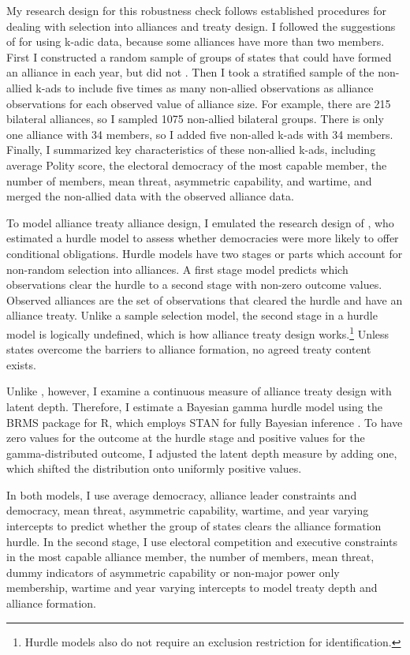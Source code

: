 \documentclass[12pt]{article}
\begin{document}
My research design for this robustness check follows established procedures for dealing with selection into alliances and treaty design. 
I followed the suggestions of \citet{Poast2010} for using k-adic data, because some alliances have more than two members. 
First I constructed a random sample of groups of states that could have formed an alliance in each year, but did not \citep{FordhamPoast2014}.
Then I took a stratified sample of the non-allied k-ads to include five times as many non-allied observations as alliance observations for each observed value of alliance size. 
For example, there are 215 bilateral alliances, so I sampled 1075 non-allied bilateral groups. 
There is only one alliance with 34 members, so I added five non-alled k-ads with 34 members. 
Finally, I summarized key characteristics of these non-allied k-ads, including average Polity score, the electoral democracy of the most capable member, the number of members, mean threat, asymmetric capability, and wartime, and merged the non-allied data with the observed alliance data. 


To model alliance treaty alliance design, I emulated the research design of \citet{Chibaetal2015}, who estimated a hurdle model to assess whether democracies were more likely to offer conditional obligations.
Hurdle models have two stages or parts which account for non-random selection into alliances.
A first stage model predicts which observations clear the hurdle to a second stage with non-zero outcome values. 
Observed alliances are the set of observations that cleared the hurdle and have an alliance treaty. 
Unlike a sample selection model, the second stage in a hurdle model is logically undefined, which is how alliance treaty design works.\footnote{Hurdle models also do not require an exclusion restriction for identification.} 
Unless states overcome the barriers to alliance formation, no agreed treaty content exists. 


Unlike \citet{Chibaetal2015}, however, I examine a continuous measure of alliance treaty design with latent depth. 
Therefore, I estimate a Bayesian gamma hurdle model using the BRMS package for \textsf{R}, which employs STAN for fully Bayesian inference \citep{Buerkner2017}.
To have zero values for the outcome at the hurdle stage and positive values for the gamma-distributed outcome, I adjusted the latent depth measure by adding one, which shifted the distribution onto uniformly positive values. 


In both models, I use average democracy, alliance leader constraints and democracy, mean threat, asymmetric capability, wartime, and year varying intercepts to predict whether the group of states clears the alliance formation hurdle.
In the second stage, I use electoral competition and executive constraints in the most capable alliance member, the number of members, mean threat, dummy indicators of asymmetric capability or non-major power only membership, wartime and year varying intercepts to model treaty depth and alliance formation. 
\end{document}
